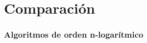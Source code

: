 \section[Comparación de algoritmos del mismo orden]{Comparación}
\begin{frame}[plain]
%	
%	
		
\end{frame}

		
\begin{frame}[plain]
	\frametitle{Algoritmos de orden n-logarítmico}
%	
%	
%	
\end{frame}	